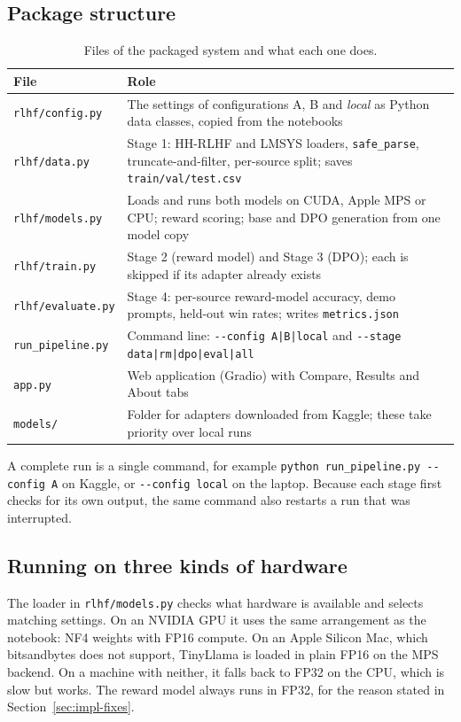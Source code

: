 \subsection{Package structure}

\begin{table}[!htbp]
\centering
\caption[Files of the packaged system]{Files of the packaged system and what each one does.}
\label{tab:package}
\small
\begin{tabularx}{\textwidth}{@{}L{3.6cm}Y@{}}
\toprule
\textbf{File} & \textbf{Role}\\
\midrule
\texttt{rlhf/config.py} & The settings of configurations A, B and \emph{local} as Python data classes, copied from the notebooks\\
\texttt{rlhf/data.py} & Stage 1: HH-RLHF and LMSYS loaders, \texttt{safe\_parse}, truncate-and-filter, per-source split; saves \texttt{train/val/test.csv}\\
\texttt{rlhf/models.py} & Loads and runs both models on CUDA, Apple MPS or CPU; reward scoring; base and DPO generation from one model copy\\
\texttt{rlhf/train.py} & Stage 2 (reward model) and Stage 3 (DPO); each is skipped if its adapter already exists\\
\texttt{rlhf/evaluate.py} & Stage 4: per-source reward-model accuracy, demo prompts, held-out win rates; writes \texttt{metrics.json}\\
\texttt{run\_pipeline.py} & Command line: \texttt{-{}-config A|B|local} and \texttt{-{}-stage data|rm|dpo|eval|all}\\
\texttt{app.py} & Web application (Gradio) with Compare, Results and About tabs\\
\texttt{models/} & Folder for adapters downloaded from Kaggle; these take priority over local runs\\
\bottomrule
\end{tabularx}
\end{table}

A complete run is a single command, for example \texttt{python run\_pipeline.py -{}-config A} on Kaggle, or \texttt{-{}-config local} on the laptop. Because each stage first checks for its own output, the same command also restarts a run that was interrupted.

\subsection{Running on three kinds of hardware}
The loader in \texttt{rlhf/models.py} checks what hardware is available and selects matching settings. On an NVIDIA GPU it uses the same arrangement as the notebook: NF4 weights with FP16 compute. On an Apple Silicon Mac, which bitsandbytes does not support, TinyLlama is loaded in plain FP16 on the MPS backend. On a machine with neither, it falls back to FP32 on the CPU, which is slow but works. The reward model always runs in FP32, for the reason stated in Section~\ref{sec:impl-fixes}.

